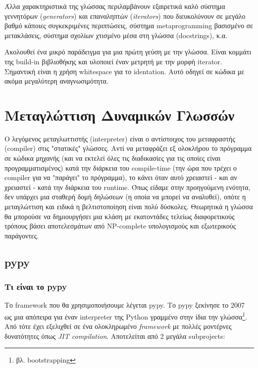 Άλλα χαρακτηριστικά της γλώσσας περιλαμβάνουν εξαιρετικά καλό σύστημα γεννητόρων
(\textit{generators}) και επαναληπτών (\textit{iterators}) που διευκολύνουν σε
μεγάλο βαθμό κάποιες συγκεκριμένες περιπτώσεις, σύστημα metaprogramming
βασισμένο σε μετακλάσεις, σύστημα σχολίων χτισμένο μέσα στη γλώσσα (docstrings),
κ.α.

Ακολουθεί ένα μικρό παράδειγμα για μια πρώτη γεύση με την γλώσσα. Είναι κομμάτι
της build-in βιβλιοθήκης και υλοποιεί έναν μετρητή με την μορφή iterator.
Σημαντική είναι η χρήση whitespace για το identation. Αυτό οδηγεί σε κώδικα με
ακόμα μεγαλύτερη αναγνωσιμότητα.



\section{Μεταγλώττιση Δυναμικών Γλωσσών}

Ο λεγόμενος μεταγλωττιστής (interpreter) είναι ο αντίστοιχος του μεταφραστής
(compiler) στις "στατικές" γλώσσες. Αντί να μεταφράζει εξ ολοκλήρου το
πρόγραμμα σε κώδικα μηχανής (και να εκτελεί όλες τις διαδικασίες για τις οποίες
είναι προγραμματισμένος) κατά την διάρκεια του compile-time (την ώρα που τρέχει
ο compiler για να "παράγει" το πρόγραμμα), το κάνει όταν αυτό χρειαστεί - και
αν χρειαστεί - κατά την διάρκεια του runtime. Όπως είδαμε στην προηγούμενη
ενότητα, δεν υπάρχει μια σταθερή δομή δηλώσεων (η οποία να μπορεί να αναλυθεί),
οπότε η μεταγλώττιση και ειδικά η βελτιστοποίηση είναι πολύ δύσκολες. Θεωρητικά
η γλώσσα θα μπορούσε να δημιουργήσει μια κλάση με εκατοντάδες τελείως
διαφορετικούς τρόπους βάσει αποτελεσμάτων από NP-complete υπολογισμούς και
εξωτερικούς παράγοντες.\cite{rigo2005}

\subsection{pypy}

\subsubsection{Τι είναι το pypy}

Το framework που θα χρησιμοποιήσουμε λέγεται pypy\cite{pypy}. Το pypy ξεκίνησε
το 2007 ως μια απόπειρα για έναν interpreter της Python γραμμένο στην ίδια την
γλώσσα\footnote{βλ. bootstrapping}. Από τότε έχει εξελιχθεί σε ένα ολοκληρωμένο
\textit{framework} με πολλές μοντέρνες δυνατότητες όπως \textit{JIT
compilation}. Αποτελείται από 2 μεγάλα subprojects:

